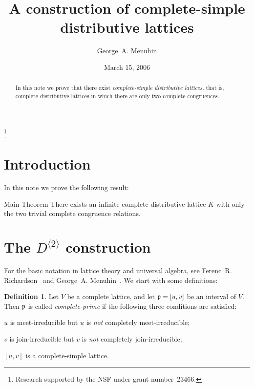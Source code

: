 \documentclass{amsart}
\theoremstyle{plain}
\theoremstyle{definition}
\newtheorem{definition}{Definition}
\theoremstyle{remark}
\numberwithin{equation}{section}
\newcommand{\Dsq}{D^{\langle2\rangle}}
\begin{document}
\title[Complete-simple distributive lattices]
      {A construction of complete-simple\\ 
       distributive lattices}
\author{George~A. Menuhin}
\address{Computer Science Department\\
         University of Winnebago\\
         Winnebago, Minnesota 23714} 
\thanks{Research supported by the NSF under grant number~23466.} 
\date{March 15, 2006}

\begin{abstract}
   In this note we prove that there exist \emph{complete-simple 
   distributive lattices,} that is, complete distributive 
   lattices in which there are only two complete congruences. 
\end{abstract}
\maketitle

\section{Introduction}\label{S:intro} 
In this note we prove the following result:

\begin{named}{Main Theorem}
   There exists an infinite complete distributive lattice 
   $K$ with only the two trivial complete congruence relations. 
\end{named}

\section{The $\Dsq$ construction}\label{S:Ds}  
For the basic notation in lattice theory and universal algebra, 
see Ferenc~R. Richardson~\cite{fR82} and George~A. 
Menuhin~\cite{gM68}. We start with some definitions:

\begin{definition}\label{D:prime}
   Let $V$ be a complete lattice, and let $\mathfrak{p} = [u, v]$ be
   an interval of $V$. Then $\mathfrak{p}$ is called 
   \emph{complete-prime} if the following three conditions 
   are satisfied:
   \begin{enumeratei}
      \item $u$ is meet-irreducible but $u$ is \emph{not}
         completely meet-irreducible;\label{m-i}
      \item $v$ is join-irreducible but $v$ is \emph{not} 
         completely join-irreducible;\label{j-i}
      \item $[u, v]$ is a complete-simple lattice.\label{c-s}
   \end{enumeratei}
\end{definition}
\end{document}
